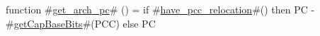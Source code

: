 function #\hyperref[sailRISCVzgetzyarchzypc]{get\_arch\_pc}# () =
  if #\hyperref[sailRISCVzhavezypcczyrelocation]{have\_pcc\_relocation}#() then PC - #\hyperref[sailRISCVzgetCapBaseBits]{getCapBaseBits}#(PCC) else PC
